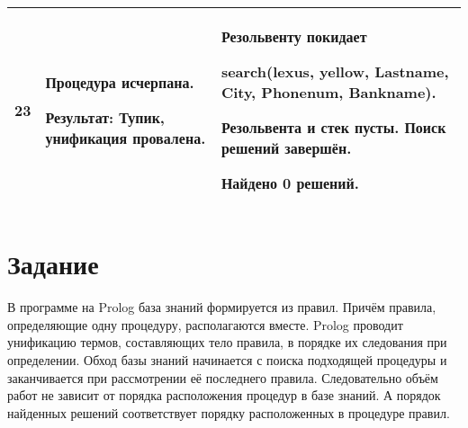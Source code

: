 \begin{longtable}{|c|p{}|p{}|}
    23
                       &
    Процедура исчерпана.
    \newline

    \textbf{Результат:} \newline
    Тупик, унификация провалена.
                       &
    Резольвенту покидает

    search(lexus, yellow, Lastname, City, Phonenum, Bankname).
    \newline

    Резольвента и стек пусты. Поиск решений завершён.

    \textbf{Найдено 0 решений.}
                       \\ \hline
\end{longtable}
\normalsize

\renewcommand{\arraystretch}{1}

\section{Задание }

В программе на Prolog база знаний формируется из правил. Причём правила, определяющие одну процедуру, располагаются вместе. Prolog проводит унификацию термов, составляющих тело правила, в порядке их следования при определении. Обход базы знаний начинается с поиска подходящей процедуры и заканчивается при рассмотрении её последнего правила. Следовательно объём работ не зависит от порядка расположения процедур в базе знаний. А порядок найденных решений соответствует порядку расположенных в процедуре правил.

